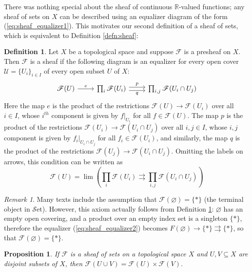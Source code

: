 \documentclass[10pt,oneside]{book}
\def\~#1{\mathscr{#1}}
\newcommand{\R}{\mathbb{R}}
\newcommand{\Set}{\~S\mathrm{et}}
\theoremstyle{plain}
\newtheorem{prop}[thm]{Proposition}
\theoremstyle{definition}
\newtheorem{defn}[thm]{Definition}
\theoremstyle{remark}
\newtheorem*{rmk}{Remark}
\numberwithin{equation}{section}
\numberwithin{figure}{section}
\begin{document}
There was nothing special about the sheaf of continuous $\R$-valued functions; any sheaf of sets on $X$ can be described using an equalizer diagram of the form (\ref{eq:sheaf_equalizer1}). This motivates our second definition of a sheaf of sets, which is equivalent to Definition \ref{defn:sheaf}:

\begin{defn}\label{defn:sheaf2}
    Let $X$ be a topological space and suppose $\~F$ is a presheaf on $X$. Then $\~F$ is a sheaf if the following diagram is an equalizer for every open cover $\~U = \{U_i\}_{i \in I}$ of every open subset $U$ of $X$:
    \begin{equation}\label{eq:sheaf_equalizer2}
    \begin{tikzcd}
        {\~F(U)} & {\prod_i \~F(U_i)} & {\prod_{i,j} \~F(U_i \cap U_j)}
        \arrow["e",from=1-1, to=1-2]
        \arrow["p",shift left, from=1-2, to=1-3]
        \arrow["q"', shift right, from=1-2, to=1-3]
    \end{tikzcd}
    \end{equation}
    Here the map $e$ is the product of the restrictions $\~F(U) \to \~F(U_i)$ over all $i \in I$, whose $i^{th}$ component is given by $f|_{U_i}$ for all $f \in \~F(U)$. The map $p$ is the product of the restrictions $\~F(U_i) \to \~F(U_i \cap U_j)$ over all $i, j \in I$, whose $i, j$ component is given by $f_i|_{U_i \cap U_j}$ for all $f_i \in \~F(U_i)$, and similarly, the map $q$ is the product of the restrictions $\~F(U_j) \to \~F(U_i \cap U_j)$. Omitting the labels on arrows, this condition can be written as 
    \begin{equation}
    \label{eq:sheaf_limit}
        \~F(U) = \lim \left(\prod_i \~F(U_i) \rightrightarrows \prod_{i,j} \~F(U_i \cap U_j) \right)
    \end{equation}
\end{defn}

\begin{rmk}
    Many texts include the assumption that $\~F(\varnothing) = \{\ast\}$ (the terminal object in $\Set$). However, this axiom actually follows from Definition \ref{defn:sheaf2}: $\varnothing$ has an empty open covering, and a product over an empty index set is a singleton $\{\ast\}$, therefore the equalizer (\ref{eq:sheaf_equalizer2}) becomes $F(\varnothing) \to \{\ast\} \rightrightarrows \{\ast\}$, so that $\~F(\varnothing) = \{\ast\}$.
\end{rmk}

\begin{prop}
    If $\~F$ is a sheaf of sets on a topological space $X$ and $U, V \subseteq X$ are disjoint subsets of $X$, then $\~F(U \cup V) = \~F(U) \times \~F(V)$.
\end{prop}
\end{document}
